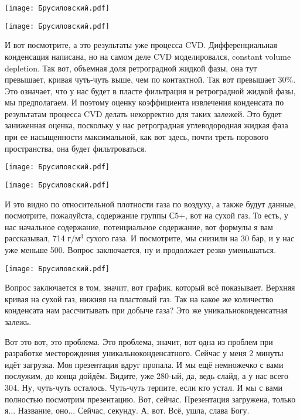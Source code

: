 \documentclass[main.tex]{subfiles}
\begin{document}
\begin{center}
\texttt{[image: Брусиловский.pdf]}
\end{center}

\begin{center}
\texttt{[image: Брусиловский.pdf]}
\end{center}

И вот посмотрите, а это результаты уже процесса CVD.
Дифференциальная конденсация написана, но на самом деле CVD моделировался, constant volume depletion.
Так вот, объемная доля ретроградной жидкой фазы, она тут превышает, кривая чуть-чуть выше, чем по контактной.
Так вот превышает 30\%.
Это означает, что у нас будет в пласте фильтрация и ретроградной жидкой фазы, мы предполагаем.
И поэтому оценку коэффициента извлечения конденсата по результатам процесса CVD делать некорректно для таких залежей.
Это будет заниженная оценка, поскольку у нас ретроградная углеводородная жидкая фаза при ее насыщенности максимальной, как вот здесь, почти треть порового пространства, она будет фильтроваться.

\begin{center}
\texttt{[image: Брусиловский.pdf]}
\end{center}



\begin{center}
\texttt{[image: Брусиловский.pdf]}
\end{center}

И это видно по относительной плотности газа по воздуху, а также будут данные, посмотрите, пожалуйста, содержание группы С5+, вот на сухой газ.
То есть, у нас начальное содержание, потенциальное содержание, вот формулы я вам рассказывал, 714 г/м$^3$ сухого газа.
И посмотрите, мы снизили на 30 бар, и у нас уже меньше 500.
Вопрос заключается, ну и продолжает резко уменьшаться.

\begin{center}
\texttt{[image: Брусиловский.pdf]}
\end{center}

Вопрос заключается в том, значит, вот график, который всё показывает.
Верхняя кривая на сухой газ, нижняя на пластовый газ.
Так на какое же количество конденсата нам рассчитывать при добыче газа?
Это же уникальноконденсатная залежь.

Вот это вот, это проблема.
Это проблема, значит, вот одна из проблем при разработке месторождения уникальноконденсатного.
Сейчас у меня 2 минуты идёт загрузка.
Моя презентация вдруг пропала.
И мы ещё немножечко с вами послужим, до конца дойдём.
Видите, уже 280-ый, да, ведь слайд, а у нас всего 304.
Ну, чуть-чуть осталось.
Чуть-чуть терпите, если кто устал.
И мы с вами полностью посмотрим презентацию.
Вот, сейчас.
Презентация загружена, только я...
Название, оно...
Сейчас, секунду.
А, вот.
Всё, ушла, слава Богу.
\end{document}
